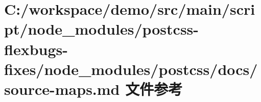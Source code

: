 \hypertarget{postcss-flexbugs-fixes_2node__modules_2postcss_2docs_2source-maps_8md}{}\section{C\+:/workspace/demo/src/main/script/node\+\_\+modules/postcss-\/flexbugs-\/fixes/node\+\_\+modules/postcss/docs/source-\/maps.md 文件参考}
\label{postcss-flexbugs-fixes_2node__modules_2postcss_2docs_2source-maps_8md}
